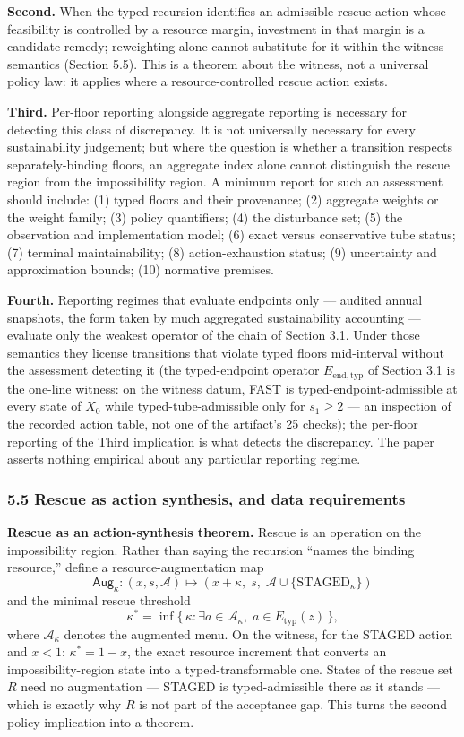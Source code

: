 \documentclass[11pt]{article}
\begin{document}
\textbf{Second.} When the typed recursion identifies an admissible
rescue action whose feasibility is controlled by a resource margin,
investment in that margin is a candidate remedy; reweighting alone
cannot substitute for it within the witness semantics (Section 5.5).
This is a theorem about the witness, not a universal policy law: it
applies where a resource-controlled rescue action exists.

\textbf{Third.} Per-floor reporting alongside aggregate reporting is
necessary for detecting this class of discrepancy. It is not universally
necessary for every sustainability judgement; but where the question is
whether a transition respects separately-binding floors, an aggregate
index alone cannot distinguish the rescue region from the impossibility
region. A minimum report for such an assessment should include: (1)
typed floors and their provenance; (2) aggregate weights or the weight
family; (3) policy quantifiers; (4) the disturbance set; (5) the
observation and implementation model; (6) exact versus conservative tube
status; (7) terminal maintainability; (8) action-exhaustion status; (9)
uncertainty and approximation bounds; (10) normative premises.

\textbf{Fourth.} Reporting regimes that evaluate endpoints only ---
audited annual snapshots, the form taken by much aggregated
sustainability accounting --- evaluate only the weakest operator of the
chain of Section 3.1. Under those semantics they license transitions
that violate typed floors mid-interval without the assessment detecting
it (the typed-endpoint operator \(E_{\mathrm{end,typ}}\) of Section 3.1
is the one-line witness: on the witness datum, FAST is
typed-endpoint-admissible at every state of \(X_0\) while
typed-tube-admissible only for \(s_1 \ge 2\) --- an inspection of the
recorded action table, not one of the artifact's 25 checks); the
per-floor reporting of the Third implication is what detects the
discrepancy. The paper asserts nothing empirical about any particular
reporting regime.

\subsubsection{5.5 Rescue as action synthesis, and data
requirements}\label{rescue-as-action-synthesis-and-data-requirements}

\textbf{Rescue as an action-synthesis theorem.} Rescue is an operation
on the impossibility region. Rather than saying the recursion ``names
the binding resource,'' define a resource-augmentation map
\[\mathsf{Aug}_\kappa : (x, s, \mathcal{A}) \mapsto (x + \kappa,\; s,\; \mathcal{A} \cup \{\mathrm{STAGED}_\kappa\})\]
and the minimal rescue threshold
\[\kappa^* = \inf\{\, \kappa : \exists a \in \mathcal{A}_\kappa,\; a \in E_{\mathrm{typ}}(z) \,\},\]
where \(\mathcal{A}_\kappa\) denotes the augmented menu. On the witness,
for the STAGED action and \(x < 1\): \(\kappa^* = 1 - x\), the exact
resource increment that converts an impossibility-region state into a
typed-transformable one. States of the rescue set \(R\) need no
augmentation --- STAGED is typed-admissible there as it stands --- which
is exactly why \(R\) is not part of the acceptance gap. This turns the
second policy implication into a theorem.
\end{document}

